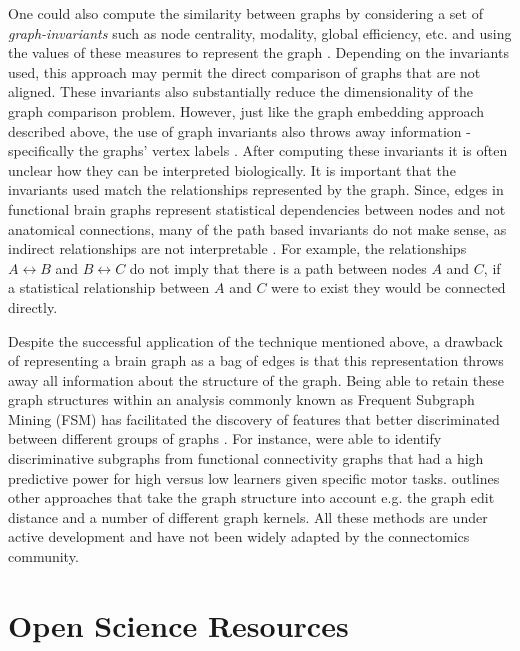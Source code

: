 One could also compute the similarity between graphs by considering a set of \emph{graph-invariants} such as node centrality, modality, global efficiency, etc. and using the values of these measures to represent the graph \cite{rubinov,bullmoreReview}. Depending on the invariants used, this approach may permit the direct comparison of graphs that are not aligned. These invariants also substantially reduce the dimensionality of the graph comparison problem. However, just like the graph embedding approach described above, the use of graph invariants also throws away information - specifically the graphs' vertex labels \cite{Vogelstein2012}. After computing these invariants it is often unclear how they can be interpreted biologically. It is important that the invariants used match the relationships represented by the graph. Since, edges in functional brain graphs represent statistical dependencies between nodes and not anatomical connections, many of the path based invariants do not make sense, as indirect relationships are not interpretable \cite{}. For example, the relationships $A \leftrightarrow B$ and $B \leftrightarrow C$ do not imply that there is a path between nodes $A$ and $C$, if a statistical relationship between $A$ and $C$ were to exist they would be connected directly.

Despite the successful application of the technique mentioned above, a drawback of representing a brain graph as a bag of edges is that this representation throws away all information about the structure of the graph. Being able to retain these graph structures within an analysis commonly known as Frequent Subgraph Mining (FSM) has facilitated the discovery of features that better discriminated between different groups of graphs \cite{Harrison2013}. For instance, \cite{Bogdanov2014} were able to identify discriminative subgraphs from functional connectivity graphs that had a high predictive power for high versus low learners given specific motor tasks. \cite{Richiardi2013} outlines other approaches that take the graph structure into account e.g. the graph edit distance and a number of different graph kernels. All these methods are under active development and have not been widely adapted by the connectomics community.

   


\section{Open Science Resources}

